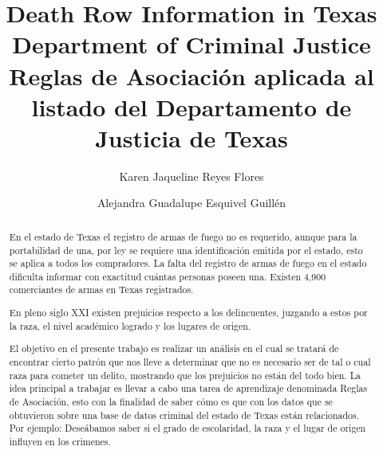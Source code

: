 \documentclass[sigconf]{acmart}
\begin{document}
\title{Death Row Information in Texas Department of Criminal Justice \\ Reglas de Asociación aplicada al listado del Departamento de Justicia de Texas}
\author{Karen Jaqueline Reyes Flores}

\author{Alejandra Guadalupe Esquivel Guillén}
\renewcommand{\shortauthors}{MINERIA DE DATOS}
\renewcommand{\abstractname}{Resumen}
\begin{abstract}
En el estado de Texas el registro de armas de fuego no es requerido, aunque para la portabilidad de una, por ley se requiere una identificación emitida por el estado, esto se aplica a todos los compradores. La falta del registro de armas de fuego en el estado dificulta informar con exactitud cuántas personas poseen una. Existen 4,900 comerciantes de armas en Texas registrados.

En pleno siglo XXI existen prejuicios respecto a los delincuentes, juzgando a estos por la raza, el nivel académico logrado y los lugares de origen.

El objetivo en el presente trabajo es realizar un análisis en el cual se tratará de encontrar cierto patrón que nos lleve a determinar que no es necesario ser de tal o cual raza para cometer un delito, mostrando que los prejuicios no están del todo bien.
La idea principal a trabajar es llevar a cabo una tarea de aprendizaje denominada Reglas de Asociación, esto con la finalidad de saber cómo es que con los datos que se obtuvieron sobre una base de datos criminal del estado de Texas están relacionados.
\\Por ejemplo: Deseábamos saber si el grado de escolaridad, la raza y el lugar de origen influyen en los crimenes.

\end{abstract}

\end{document}
